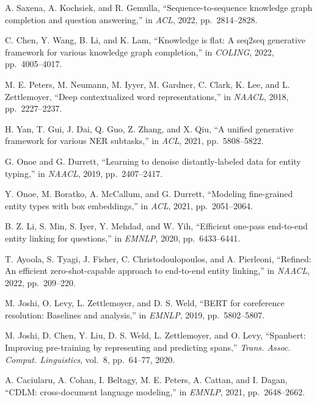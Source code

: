 \begin{enumerate}[leftmargin=2em,label={[\arabic*]}]
\item A. Saxena, A. Kochsiek, and R. Gemulla, ``Sequence-to-sequence knowledge graph completion and question answering,'' in \textit{ACL}, 2022, pp.~2814--2828.

\item C. Chen, Y. Wang, B. Li, and K. Lam, ``Knowledge is flat: A seq2seq generative framework for various knowledge graph completion,'' in \textit{COLING}, 2022, pp.~4005--4017.

\item M. E. Peters, M. Neumann, M. Iyyer, M. Gardner, C. Clark, K. Lee, and L. Zettlemoyer, ``Deep contextualized word representations,'' in \textit{NAACL}, 2018, pp.~2227--2237.

\item H. Yan, T. Gui, J. Dai, Q. Guo, Z. Zhang, and X. Qiu, ``A unified generative framework for various NER subtasks,'' in \textit{ACL}, 2021, pp.~5808--5822.

\item G. Onoe and G. Durrett, ``Learning to denoise distantly-labeled data for entity typing,'' in \textit{NAACL}, 2019, pp.~2407--2417.

\item Y. Onoe, M. Boratko, A. McCallum, and G. Durrett, ``Modeling fine-grained entity types with box embeddings,'' in \textit{ACL}, 2021, pp.~2051--2064.

\item B. Z. Li, S. Min, S. Iyer, Y. Mehdad, and W. Yih, ``Efficient one-pass end-to-end entity linking for questions,'' in \textit{EMNLP}, 2020, pp.~6433--6441.

\item T. Ayoola, S. Tyagi, J. Fisher, C. Christodoulopoulos, and A. Pierleoni, ``Refined: An efficient zero-shot-capable approach to end-to-end entity linking,'' in \textit{NAACL}, 2022, pp.~209--220.

\item M. Joshi, O. Levy, L. Zettlemoyer, and D. S. Weld, ``BERT for coreference resolution: Baselines and analysis,'' in \textit{EMNLP}, 2019, pp.~5802--5807.

\item M. Joshi, D. Chen, Y. Liu, D. S. Weld, L. Zettlemoyer, and O. Levy, ``Spanbert: Improving pre-training by representing and predicting spans,'' \textit{Trans. Assoc. Comput. Linguistics}, vol.~8, pp.~64--77, 2020.

\item A. Caciularu, A. Cohan, I. Beltagy, M. E. Peters, A. Cattan, and I. Dagan, ``CDLM: cross-document language modeling,'' in \textit{EMNLP}, 2021, pp.~2648--2662.


\end{enumerate}
